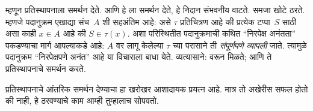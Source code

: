 \documentclass[../../../include/open-logic-section]{subfiles}
\begin{document}
म्हणून \stagescofin{} प्रतिस्थापनाला समर्थन देते. आणि \stagesinex{} हे \stagescofin{} ला समर्थन देते, हे निदान संभवनीय वाटते. समजा \stagescofin{} खोटे ठरते. म्हणजे पदानुक्रम एखाद्या संच~$A$ शी सहअंतिम आहे: असे $\tau$ प्रतिचित्रण आहे की प्रत्येक टप्पा~$S$ साठी असा काही $x \in A$ आहे की $S \in \tau(x)$. अशा परिस्थितीत पदानुक्रमाची कथित ``निरपेक्ष अनंतता'' पकडण्याचा मार्ग आपल्याकडे आहे: $A$ वर लागू केलेल्या $\tau$ च्या परासाने ती \emph{संपूर्णपणे व्यापली} जाते. त्यामुळे पदानुक्रम ``निरपेक्षपणे अनंत'' आहे या विचाराला बाधा येते. व्यत्यासाने: \stagesinex{} वरून \stagescofin{} मिळते; आणि ते प्रतिस्थापनाचे समर्थन करते.

प्रतिस्थापनाचे आंतरिक समर्थन देण्याचा हा खरोखर आशादायक प्रयत्न आहे. मात्र तो अखेरीस सफल होतो की नाही, हे ठरवण्याचे काम आम्ही तुम्हालाच सोपवतो.
\end{document}
